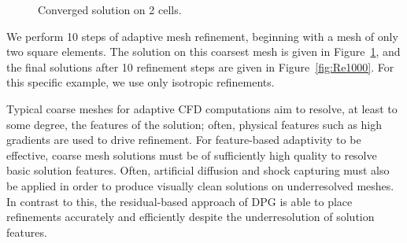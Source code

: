 \begin{figure}
\centering
{}
\caption{Converged solution on 2 cells.}
\label{fig:Re1000_2cells}
\end{figure}

We perform 10 steps of adaptive mesh refinement, beginning with a mesh of only two square elements.  The solution on this coarsest mesh is given in Figure~\ref{fig:Re1000_2cells}, and the final solutions after 10 refinement steps are given in Figure~\ref{fig:Re1000}.  For this specific example, we use only isotropic refinements.  

Typical coarse meshes for adaptive CFD computations aim to resolve, at least to some degree, the features of the solution; often, physical features such as high gradients are used to drive refinement.  For feature-based adaptivity to be effective, coarse mesh solutions must be of sufficiently high quality to resolve basic solution features.  Often, artificial diffusion and shock capturing must also be applied in order to produce visually clean solutions on underresolved meshes.  In contrast to this, the residual-based approach of DPG is able to place refinements accurately and efficiently despite the underresolution of solution features.  

